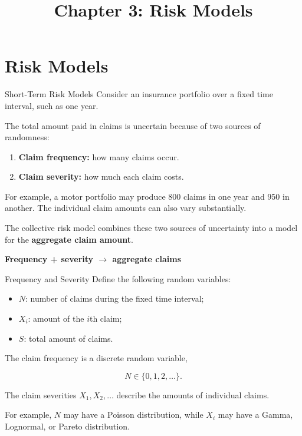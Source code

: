 \documentclass[
  ignorenonframetext,
  aspectratio=169,
]{beamer}
\title{\texorpdfstring{Chapter 3: Risk Models}{Chapter 3: Risk Models}}
\author{}
\date{}
\providecommand{\tightlist}{%
  \setlength{\itemsep}{0pt}\setlength{\parskip}{0pt}}
\begin{document}
\frame{\titlepage}


\section{Risk Models}\label{risk-models}

\begin{frame}{Short-Term Risk Models}
\protect{}\label{short-term-risk-models}
Consider an insurance portfolio over a fixed time interval, such as one
year.

The total amount paid in claims is uncertain because of two sources of
randomness:

\begin{enumerate}
\tightlist
\item
  \textbf{Claim frequency:} how many claims occur.
\item
  \textbf{Claim severity:} how much each claim costs.
\end{enumerate}

For example, a motor portfolio may produce 800 claims in one year and
950 in another. The individual claim amounts can also vary
substantially.

The collective risk model combines these two sources of uncertainty into
a model for the \textbf{aggregate claim amount}.

\begin{tcolorbox}[enhanced jigsaw, arc=.35mm, bottomrule=.15mm, bottomtitle=1mm, breakable, colback=white, colbacktitle=quarto-callout-note-color!10!white, colframe=quarto-callout-note-color-frame, coltitle=black, left=2mm, leftrule=.75mm, opacityback=0, opacitybacktitle=0.6, rightrule=.15mm, title=\textcolor{quarto-callout-note-color}{\faInfo}\hspace{0.5em}{Key idea}, titlerule=0mm, toprule=.15mm, toptitle=1mm]

\textbf{Frequency + severity \(\longrightarrow\) aggregate claims}

\end{tcolorbox}
\end{frame}

\begin{frame}{Frequency and Severity}
\protect{}\label{frequency-and-severity}
Define the following random variables:

\begin{itemize}
\tightlist
\item
  \(N\): number of claims during the fixed time interval;
\item
  \(X_i\): amount of the \(i\)th claim;
\item
  \(S\): total amount of claims.
\end{itemize}

The claim frequency is a discrete random variable,

\[
N\in\{0,1,2,\ldots\}.
\]

The claim severities \(X_1,X_2,\ldots\) describe the amounts of
individual claims.

For example, \(N\) may have a Poisson distribution, while \(X_i\) may
have a Gamma, Lognormal, or Pareto distribution.
\end{frame}
\end{document}
